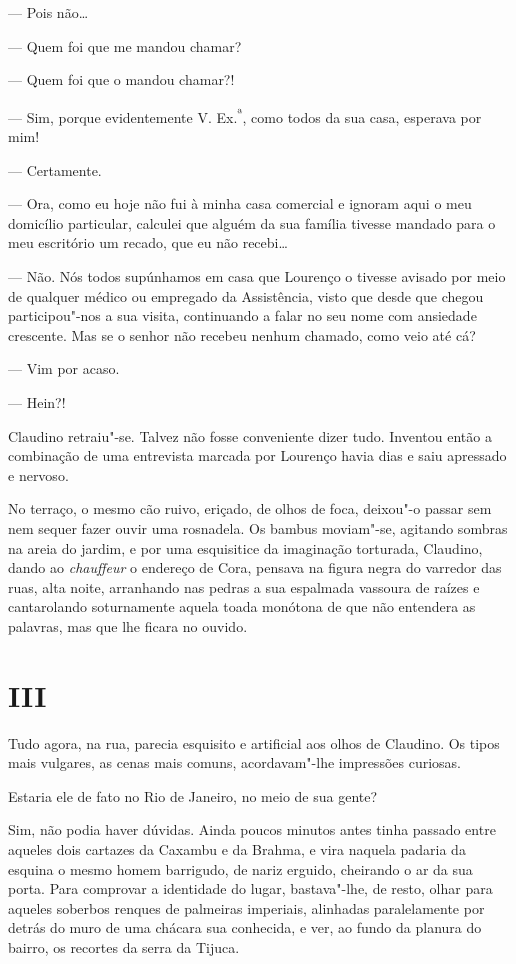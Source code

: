 --- Pois não\ldots{}

--- Quem foi que me mandou chamar?

--- Quem foi que o mandou chamar?!

--- Sim, porque evidentemente V. Ex.\textsuperscript{ª}, como todos da
sua casa, esperava por mim!

--- Certamente.

--- Ora, como eu hoje não fui à minha casa comercial e ignoram aqui o
meu domicílio particular, calculei que alguém da sua família tivesse
mandado para o meu escritório um recado, que eu não recebi\ldots{}

--- Não. Nós todos supúnhamos em casa que Lourenço o tivesse avisado por
meio de qualquer médico ou empregado da Assistência, visto que desde que
chegou participou"-nos a sua visita, continuando a falar no seu nome com
ansiedade crescente. Mas se o senhor não recebeu nenhum chamado, como
veio até cá?

--- Vim por acaso.

--- Hein?!

Claudino retraiu"-se. Talvez não fosse conveniente dizer tudo. Inventou
então a combinação de uma entrevista marcada por Lourenço havia dias e
saiu apressado e nervoso.

No terraço, o mesmo cão ruivo, eriçado, de olhos de foca, deixou"-o
passar sem nem sequer fazer ouvir uma rosnadela. Os bambus moviam"-se,
agitando sombras na areia do jardim, e por uma esquisitice da imaginação
torturada, Claudino, dando ao \emph{chauffeur}
o endereço de Cora, pensava na figura negra do varredor das ruas, alta
noite, arranhando nas pedras a sua espalmada vassoura de raízes e
cantarolando soturnamente aquela toada monótona de que não entendera as
palavras, mas que lhe ficara no ouvido.

\section{III}

Tudo agora, na rua, parecia esquisito e artificial aos olhos de
Claudino. Os tipos mais vulgares, as cenas mais comuns, acordavam"-lhe
impressões curiosas.

Estaria ele de fato no Rio de Janeiro, no meio de sua gente?

Sim, não podia haver dúvidas. Ainda poucos minutos antes tinha passado
entre aqueles dois cartazes da Caxambu e da Brahma, e vira naquela
padaria da esquina o mesmo homem barrigudo, de nariz erguido, cheirando
o ar da sua porta. Para comprovar a identidade do lugar, bastava"-lhe, de
resto, olhar para aqueles soberbos renques de palmeiras imperiais,
alinhadas paralelamente por detrás do muro de uma chácara sua conhecida,
e ver, ao fundo da planura do bairro, os recortes da serra da Tijuca.


